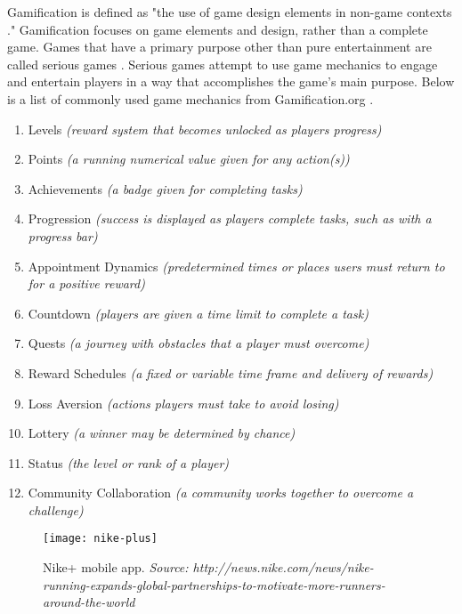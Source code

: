 Gamification is defined as "the use of game design elements in non-game contexts \cite{Deterding}." Gamification focuses on game elements and design, rather than a complete game. Games that have a primary purpose other than pure entertainment are called serious games \cite{Serious_Games}. Serious games attempt to use game mechanics to engage and entertain players in a way that accomplishes the game's main purpose. Below is a list of commonly used game mechanics from Gamification.org \cite{gamification}. 

\begin{enumerate}
  \item Levels \textit{(reward system that becomes unlocked as players progress)}
  \item Points \textit{(a running numerical value given for any action(s))}
  \item Achievements \textit{(a badge given for completing tasks)}
  \item Progression \textit{(success is displayed as players complete tasks, such as with a progress bar)}
  \item Appointment Dynamics \textit{(predetermined times or places users must return to for a positive reward)}
  \item Countdown \textit{(players are given a time limit to complete a task)}
  \item Quests \textit{(a journey with obstacles that a player must overcome)}
  \item Reward Schedules \textit{(a fixed or variable time frame and delivery of rewards)}
  \item Loss Aversion \textit{(actions players must take to avoid losing)}
  \item Lottery \textit{(a winner may be determined by chance)}
  \item Status \textit{(the level or rank of a player)}
  \item Community Collaboration \textit{(a community works together to overcome a challenge)}

\end{enumerate}

\begin{figure}[h]
\centering
\texttt{[image: nike-plus]}
\caption{Nike+ mobile app. \textit{Source: http://news.nike.com/news/nike-running-expands-global-partnerships-to-motivate-more-runners-around-the-world}}
\label{nike-plus}
\end{figure}

